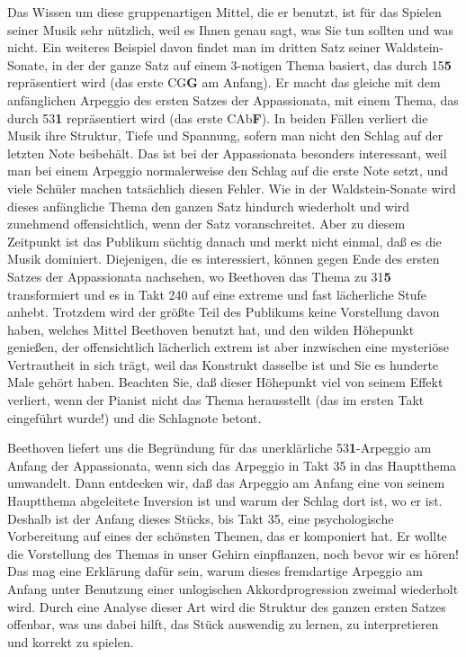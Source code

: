 Das Wissen um diese gruppenartigen Mittel, die er benutzt, ist für das Spielen seiner Musik sehr nützlich, weil es Ihnen genau sagt, was Sie tun sollten und was nicht.
Ein weiteres Beispiel davon findet man im dritten Satz seiner Waldstein-Sonate, in der der ganze Satz auf einem 3-notigen Thema basiert, das durch 15\textbf{5} repräsentiert wird (das erste CG\textbf{G} am Anfang).
Er macht das gleiche mit dem anfänglichen Arpeggio des ersten Satzes der Appassionata, mit einem Thema, das durch 53\textbf{1} repräsentiert wird (das erste CAb\textbf{F}).
In beiden Fällen verliert die Musik ihre Struktur, Tiefe und Spannung, sofern man nicht den Schlag auf der letzten Note beibehält.
Das ist bei der Appassionata besonders interessant, weil man bei einem Arpeggio normalerweise den Schlag auf die erste Note setzt, und viele Schüler machen tatsächlich diesen Fehler.
Wie in der Waldstein-Sonate wird dieses anfängliche Thema den ganzen Satz hindurch wiederholt und wird zunehmend offensichtlich, wenn der Satz voranschreitet.
Aber zu diesem Zeitpunkt ist das Publikum süchtig danach und merkt nicht einmal, daß es die Musik dominiert.
Diejenigen, die es interessiert, können gegen Ende des ersten Satzes der Appassionata nachsehen, wo Beethoven das Thema zu 31\textbf{5} transformiert und es in Takt 240 auf eine extreme und fast lächerliche Stufe anhebt.
Trotzdem wird der größte Teil des Publikums keine Vorstellung davon haben, welches Mittel Beethoven benutzt hat, und den wilden Höhepunkt genießen, der offensichtlich lächerlich extrem ist aber inzwischen eine mysteriöse Vertrautheit in sich trägt, weil das Konstrukt dasselbe ist und Sie es hunderte Male gehört haben.
Beachten Sie, daß dieser Höhepunkt viel von seinem Effekt verliert, wenn der Pianist nicht das Thema herausstellt (das im ersten Takt eingeführt wurde!) und die Schlagnote betont.

Beethoven liefert uns die Begründung für das unerklärliche 53\textbf{1}-Arpeggio am Anfang der Appassionata, wenn sich das Arpeggio in Takt 35 in das Hauptthema umwandelt.
Dann entdecken wir, daß das Arpeggio am Anfang eine von seinem Hauptthema abgeleitete Inversion ist und warum der Schlag dort ist, wo er ist.
Deshalb ist der Anfang dieses Stücks, bis Takt 35, eine psychologische Vorbereitung auf eines der schönsten Themen, das er komponiert hat.
Er wollte die Vorstellung des Themas in unser Gehirn einpflanzen, noch bevor wir es hören!
Das mag eine Erklärung dafür sein, warum dieses fremdartige Arpeggio am Anfang unter Benutzung einer unlogischen Akkordprogression zweimal wiederholt wird.
Durch eine Analyse dieser Art wird die Struktur des ganzen ersten Satzes offenbar, was uns dabei hilft, das Stück auswendig zu lernen, zu interpretieren und korrekt zu spielen.

